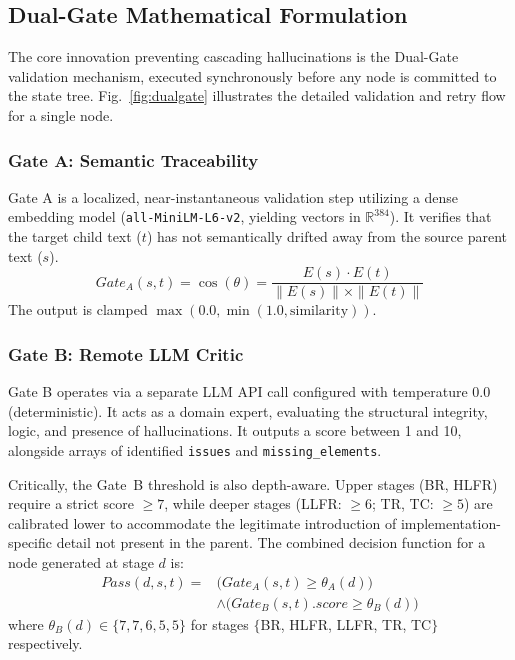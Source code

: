 \documentclass[journal]{IEEEtran}
\begin{document}
\subsection{Dual-Gate Mathematical Formulation}
The core innovation preventing cascading hallucinations is the Dual-Gate validation mechanism, executed synchronously before any node is committed to the state tree. Fig.~\ref{fig:dualgate} illustrates the detailed validation and retry flow for a single node.

\subsubsection{Gate A: Semantic Traceability}
Gate A is a localized, near-instantaneous validation step utilizing a dense embedding model (\texttt{all-MiniLM-L6-v2}, yielding vectors in $\mathbb{R}^{384}$). It verifies that the target child text ($t$) has not semantically drifted away from the source parent text ($s$).
\begin{equation}
Gate_A(s, t) = \cos(\theta) = \frac{E(s) \cdot E(t)}{\|E(s)\| \times \|E(t)\|}
\end{equation}
The output is clamped $\max(0.0, \min(1.0, \text{similarity}))$.

\subsubsection{Gate B: Remote LLM Critic}
Gate B operates via a separate LLM API call configured with temperature 0.0 (deterministic). It acts as a domain expert, evaluating the structural integrity, logic, and presence of hallucinations. It outputs a score between 1 and 10, alongside arrays of identified \texttt{issues} and \texttt{missing\_elements}.

Critically, the Gate~B threshold is also depth-aware. Upper stages (BR, HLFR) require a strict score $\geq 7$, while deeper stages (LLFR: $\geq 6$; TR, TC: $\geq 5$) are calibrated lower to accommodate the legitimate introduction of implementation-specific detail not present in the parent. The combined decision function for a node generated at stage $d$ is:
\begin{equation}
\begin{split}
Pass(d, s, t) = & \bigl(Gate_A(s, t) \geq \theta_A(d)\bigr) \\
& \wedge \bigl(Gate_B(s, t).score \geq \theta_B(d)\bigr)
\end{split}
\end{equation}
where $\theta_B(d) \in \{7, 7, 6, 5, 5\}$ for stages $\{$BR, HLFR, LLFR, TR, TC$\}$ respectively.
\end{document}
